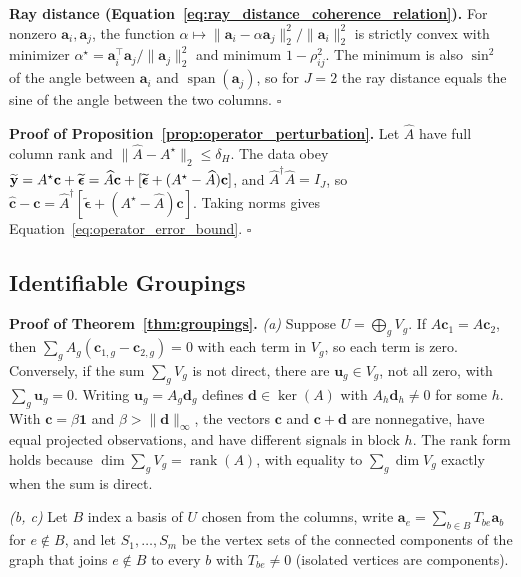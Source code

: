 \noindent\textbf{Ray distance (Equation~\ref{eq:ray_distance_coherence_relation}).}
For nonzero \(\mathbf a_i,\mathbf a_j\), the function
\(\alpha\mapsto\|\mathbf a_i-\alpha\mathbf a_j\|_2^2/\|\mathbf a_i\|_2^2\) is
strictly convex with minimizer
\(\alpha^\star=\mathbf a_i^\top\mathbf a_j/\|\mathbf a_j\|_2^2\) and minimum
\(1-\rho_{ij}^2\).  The minimum is also \(\sin^2\) of the angle between
\(\mathbf a_i\) and \(\operatorname{span}(\mathbf a_j)\), so for \(J=2\) the ray
distance equals the sine of the angle between the two columns.  \(\square\)

\noindent\textbf{Proof of Proposition~\ref{prop:operator_perturbation}.}
Let \(\widehat A\) have full column rank and \(\|\widehat A-A^\star\|_2\le\delta_H\).
The data obey
\(\widetilde{\mathbf y}=A^\star\mathbf c+\widetilde{\boldsymbol\epsilon}
=\widehat A\mathbf c+[\widetilde{\boldsymbol\epsilon}+(A^\star-\widehat A)\mathbf c]\),
and \(\widehat A^\dagger\widehat A=I_J\), so
\(\widehat{\mathbf c}-\mathbf c=\widehat A^\dagger[\widetilde{\boldsymbol\epsilon}
+(A^\star-\widehat A)\mathbf c]\).  Taking norms gives
Equation~\ref{eq:operator_error_bound}.  \(\square\)

\subsection{Identifiable Groupings}

\noindent\textbf{Proof of Theorem~\ref{thm:groupings}.}
\emph{(a)}  Suppose \(U=\bigoplus_gV_g\).  If \(A\mathbf c_1=A\mathbf c_2\), then
\(\sum_gA_g(\mathbf c_{1,g}-\mathbf c_{2,g})=0\) with each term in \(V_g\), so each
term is zero.  Conversely, if the sum \(\sum_gV_g\) is not direct, there are
\(\mathbf u_g\in V_g\), not all zero, with \(\sum_g\mathbf u_g=0\).  Writing
\(\mathbf u_g=A_g\mathbf d_g\) defines \(\mathbf d\in\ker(A)\) with
\(A_h\mathbf d_h\ne0\) for some \(h\).  With \(\mathbf c=\beta\mathbf 1\) and
\(\beta>\|\mathbf d\|_\infty\), the vectors \(\mathbf c\) and \(\mathbf c+\mathbf d\)
are nonnegative, have equal projected observations, and have different signals in
block \(h\).  The rank form holds because \(\dim\sum_gV_g=\operatorname{rank}(A)\),
with equality to \(\sum_g\dim V_g\) exactly when the sum is direct.

\emph{(b, c)}  Let \(B\) index a basis of \(U\) chosen from the columns, write
\(\mathbf a_e=\sum_{b\in B}T_{be}\mathbf a_b\) for \(e\notin B\), and let
\(S_1,\dots,S_m\) be the vertex sets of the connected components of the graph that
joins \(e\notin B\) to every \(b\) with \(T_{be}\ne0\) (isolated vertices are
components).

